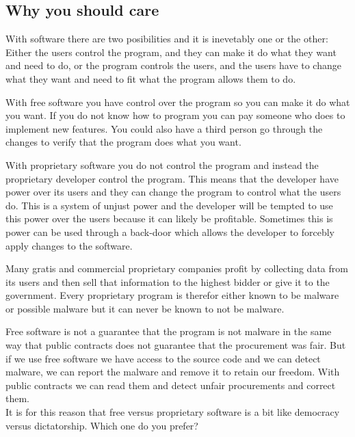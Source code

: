 \documentclass[12pt,a4paper]{article}
\begin{document}
\subsection{Why you should care}
With software there are two posibilities and it is inevetably one or the other: Either the users control the program, and they can make it do what they want and need to do, or the program controls the users, and the users have to change what they want and need to fit what the program allows them to do.

With free software you have control over the program so you can make it do what you want. If you do not know how to program you can pay someone who does to implement new features. You could also have a third person go through the changes to verify that the program does what you want.

With proprietary software you do not control the program and instead the proprietary developer control the program. This means that the developer have power over its users and they can change the program to control what the users do. This is a system of unjust power and the developer will be tempted to use this power over the users because it can likely be profitable. Sometimes this is power can be used through a back-door which allows the developer to forcebly apply changes to the software.

Many gratis and commercial proprietary companies profit by collecting data from its users and then sell that information to the highest bidder or give it to the government. Every proprietary program is therefor either known to be malware or possible malware but it can never be known to not be malware.

Free software is not a guarantee that the program is not malware in the same way that public contracts does not guarantee that the procurement was fair. But if we use free software we have access to the source code and we can detect malware, we can report the malware and remove it to retain our freedom. With public contracts we can read them and detect unfair procurements and correct them.\\
It is for this reason that free versus proprietary software is a bit like democracy versus dictatorship. Which one do you prefer?
\end{document}
